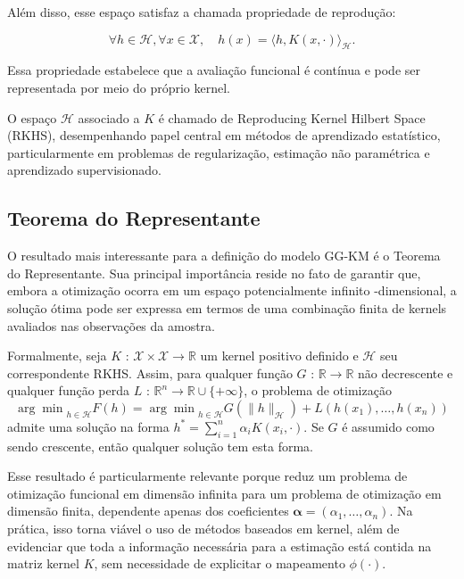 Além disso, esse espaço satisfaz a chamada propriedade de reprodução:

$$
\forall h \in \mathcal{H}, \forall x \in \mathcal{X}, \quad h(x) = \langle h, K(x,\cdot)\rangle_{\mathcal{H}}.
$$

Essa propriedade estabelece que a avaliação funcional é contínua e pode ser representada por meio do próprio
 kernel.

O espaço $\mathcal{H}$ associado a $K$ é chamado de Reproducing Kernel Hilbert Space (RKHS), desempenhando
papel central em métodos de aprendizado estatístico, particularmente em problemas de regularização,
estimação não paramétrica e aprendizado supervisionado.

\subsection{Teorema do Representante}

O resultado mais interessante para a definição do modelo GG-KM é o Teorema do Representante. Sua principal
importância reside no fato de garantir que, embora a otimização ocorra em um espaço potencialmente infinito
-dimensional, a solução ótima pode ser expressa em termos de uma combinação finita de kernels avaliados nas
observações da amostra.

Formalmente, seja $K \text{ : } \mathcal{X} \times \mathcal{X} \to \mathbb{R}$ um kernel positivo definido e
$\mathcal{H}$ seu correspondente RKHS. Assim, para qualquer função $G \text{ : } \mathbb{R} \to \mathbb{R}$ não
decrescente e qualquer função perda $L \text{ : } \mathbb{R}^n \to \mathbb{R} \cup \{+\infty\}$, o problema de otimização
$$
{\arg\min}_{h\in\mathcal{H}} F\left(h\right) = {\arg\min}_{h\in\mathcal{H}} G\left(\|h\|_{\mathcal{H}}\right) + L\left(h\left(x_1\right), \ldots, h\left(x_n\right)\right)
$$
admite uma solução na forma $h^{*} = \sum_{i=1}^{n}\alpha_i K\left(x_i, \cdot\right)$. Se $G$ é assumido como sendo crescente,
então qualquer solução tem esta forma.


Esse resultado é particularmente relevante porque reduz um problema de otimização funcional em dimensão
infinita para um problema de otimização em dimensão finita, dependente apenas dos coeficientes
$\boldsymbol{\alpha} = (\alpha_1, \ldots, \alpha_n)$. Na prática, isso torna viável o uso de métodos
baseados em kernel, além de evidenciar que toda a informação necessária para a estimação está contida na
matriz kernel $K$, sem necessidade de explicitar o mapeamento $\phi(\cdot)$.

